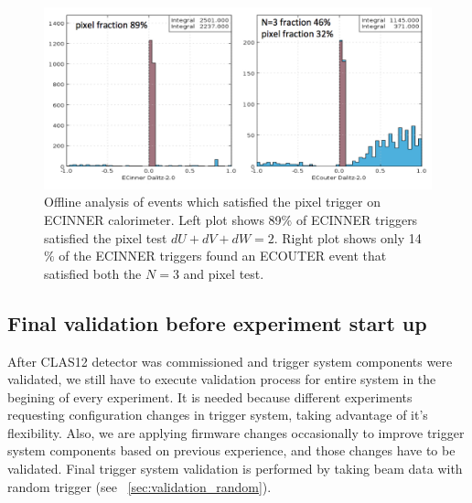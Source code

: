 \begin{figure}[!htb]
 \centering
  \includegraphics[width=1.0\columnwidth,keepaspectratio]{img/PixelFraction.png}
 \caption{Offline analysis of events which satisfied the pixel trigger on ECINNER calorimeter.  Left plot shows 89$\%$ of ECINNER triggers satisfied the pixel test $dU+dV+dW=2$.  Right plot shows only 14$\%$ of the ECINNER triggers found an ECOUTER event that satisfied both the $N=3$ and pixel test. }
\end{figure}




\subsection{Final validation before experiment start up}

After CLAS12 detector was commissioned and trigger system components were validated, we still have to execute validation process for entire system in the begining of every experiment. It is needed because different experiments requesting configuration changes in trigger system, taking advantage of it's flexibility. Also, we are applying firmware changes occasionally to improve trigger system components based on previous experience, and those changes have to be validated.
Final trigger system validation is performed by taking beam data with random trigger (see ~\ref{sec:validation_random}).

